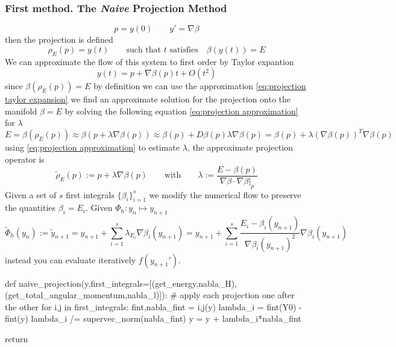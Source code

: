 \documentclass[12pt]{article}
\begin{document}
\subsubsection{First method. The \textit{Naive} Projection Method}
\begin{equation}\label{eq:projection ivp}
    p = y(0) \qquad y' = \nabla \beta
\end{equation}
then the projection is defined
\begin{equation}\label{eq:projection}
    \rho_E(p) = y(t) \qquad\text{such that $t$ satisfies} \quad\beta(y(t)) = E
\end{equation}
We can approximate the flow of this system to first order by Taylor expantion
\begin{equation}\label{eq:projection taylor expansion}
    y(t) = p + \nabla \beta(p) t + O(t^2)
\end{equation}
since $\beta(\rho_E(p))=E$ by definition we can use the approximation \eqref{eq:projection taylor expansion} we find an approximate solution for the projection onto the manifold $\beta=E$ by solving the following equation \eqref{eq:projection approximation} for $\lambda$
\begin{equation}\label{eq:projection approximation}
    E = \beta(\rho_E(p)) \approx \beta(p + \lambda\nabla\beta(p)) \approx \beta(p) + D\beta(p) \lambda \nabla \beta(p) = \beta(p) + \lambda \left(\nabla\beta(p)\right)^T\nabla\beta(p)
\end{equation}
using \eqref{eq:projection approximation} to estimate $\lambda$, the approximate projection operator is
\begin{equation}\label{eq:approximate projection operator}
    \widetilde\rho_E(p) := p + \lambda\nabla\beta(p) \qquad \text{with}\qquad \lambda := \frac{E - \beta(p)}{\nabla\beta\cdot\nabla\beta\big|_p}
\end{equation}
Given a set of $s$ first integrals $\{\beta_i\}_{i=1}^s$ we modify the numerical flow to preserve the quantities $\beta_i = E_i$. Given $\Phi_h : y_n \mapsto y_{n+1}$
\begin{equation}\label{eq:modified numerical flow}
    \widetilde \Phi_h(y_n) := \tilde y_{n+1} = y_{n+1} + \sum_{i=1}^s \lambda_{E_i}\nabla\beta_i(y_{n+1})
    = y_{n+1} + \sum_{i=1}^s \frac{E_i - \beta_i(y_{n+1})}{\nabla\beta_i(y_{n+1})^2}\nabla\beta_i(y_{n+1})
\end{equation}
instead you can evaluate iteratively $f(y_{n+1}')$.

\begin{python}\label{code:naive projection method kepler}
def naive_projection(y,first_integrals=[(get_energy,nabla_H),
                                        (get_total_angular_momentum,nabla_l)]):
    # apply each projection one after the other 
    for i,j in first_integrals:
        fint,nabla_fint = i,j(y) 
        lambda_i = fint(Y0) - fint(y) 
        lambda_i /= supervec_norm(nabla_fint)
        y = y + lambda_i*nabla_fint 
        
    return
\end{python}
\end{document}
